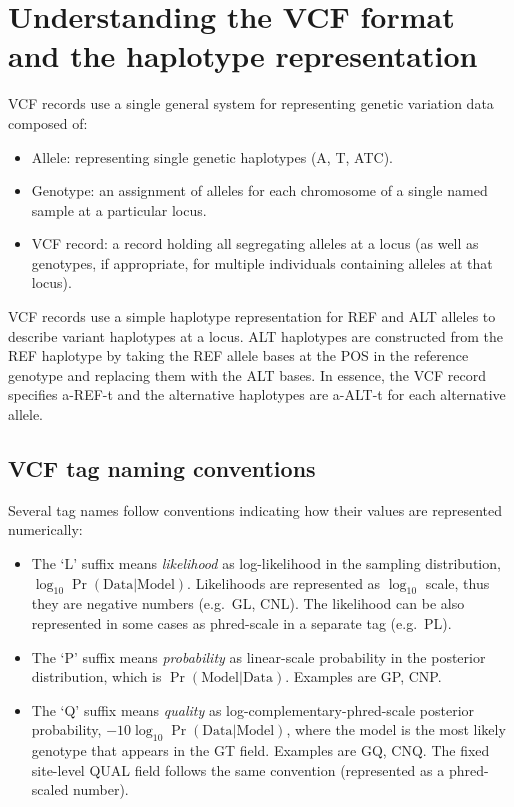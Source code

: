 \documentclass[8pt]{article}
\begin{document}
\section{Understanding the VCF format and the haplotype representation}
VCF records use a single general system for representing genetic variation data composed of:
\begin{itemize}
  \item Allele: representing single genetic haplotypes (A, T, ATC).
  \item Genotype: an assignment of alleles for each chromosome of a single named sample at a particular locus.
  \item VCF record: a record holding all segregating alleles at a locus (as well as genotypes, if appropriate, for multiple individuals containing alleles at that locus).
\end{itemize}
VCF records use a simple haplotype representation for REF and ALT alleles to describe variant haplotypes at a locus.
ALT haplotypes are constructed from the REF haplotype by taking the REF allele bases at the POS in the reference genotype and replacing them with the ALT bases.
In essence, the VCF record specifies a-REF-t and the alternative haplotypes are a-ALT-t for each alternative allele.

\subsection{VCF tag naming conventions}
Several tag names follow conventions indicating how their values are represented numerically:
\begin{itemize}
    \item The `L' suffix means \emph{likelihood} as log-likelihood in the sampling distribution, $\log_{10} \Pr(\mathrm{Data}|\mathrm{Model})$.
    Likelihoods are represented as $\log_{10}$ scale, thus they are negative numbers (e.g.\ GL, CNL).
    The likelihood can be also represented in some cases as phred-scale in a separate tag (e.g.\ PL).

    \item The `P' suffix means \emph{probability} as linear-scale probability in the posterior distribution, which is $\Pr(\mathrm{Model}|\mathrm{Data})$. Examples are GP, CNP.

    \item The `Q' suffix means \emph{quality} as log-complementary-phred-scale posterior probability, $-10 \log_{10} \Pr(\mathrm{Data}|\mathrm{Model})$, where the model is the most likely genotype that appears in the GT field.
    Examples are GQ, CNQ.
    The fixed site-level QUAL field follows the same convention (represented as a phred-scaled number).
\end{itemize}
\end{document}
